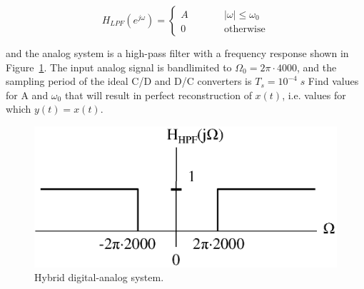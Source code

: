 \documentclass[a4paper,11pt,oneside]{article}
\begin{document}
\[
H_{LPF}(e^{j\omega})=\left\{\begin{array}{lll}
A & \qquad &|\omega|\leq \omega_{0}\\
0 & \qquad &\textrm{otherwise}
\end{array}\right.
\]

\noindent and the analog system is a high-pass filter with a frequency response shown in Figure~\ref{fig:fig4}. The input analog signal is bandlimited to $\Omega_{0}=2\pi\cdot 4000$, and the sampling period of the ideal C/D and D/C converters is $T_s=10^{-4}\;s$ Find values for A and $\omega_{0}$ that will result in perfect reconstruction of $x(t)$, i.e. values for which $y(t)=x(t)$.


\begin{figure}[h!]
\centering
\includegraphics[width=.5\textwidth]{fig4.eps}
\caption{Hybrid digital-analog system.}
\label{fig:fig4}
\end{figure}
\end{document}
